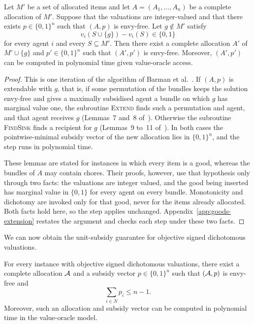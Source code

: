 \begin{lemma}
\label{lem:goods-extension}
Let $M'$ be a set of allocated items and let $A=(A_1,\ldots,A_n)$ be a complete
allocation of $M'$. Suppose that the valuations are integer-valued and that
there exists $p\in\{0,1\}^n$ such that $(A,p)$ is envy-free. Let $g\notin M'$
satisfy
\[
  v_i(S\cup\{g\})-v_i(S)\in\{0,1\}
\]
for every agent $i$ and every $S\subseteq M'$. Then there exist a complete
allocation $A'$ of $M'\cup\{g\}$ and $p'\in\{0,1\}^n$ such that $(A',p')$ is
envy-free. Moreover, $(A',p')$ can be computed in polynomial time given
value-oracle access.
\end{lemma}

\begin{proof}
This is one iteration of the algorithm of Barman et al.~\cite{BKNS22}. If
$(A,p)$ is extendable with $g$, that is, if some permutation of the bundles keeps
the solution envy-free and gives a maximally subsidised agent a bundle on which
$g$ has marginal value one, the subroutine \textsc{Extend} finds such a
permutation and agent, and that agent receives $g$ (Lemmas~7 and~8
of~\cite{BKNS22}). Otherwise the subroutine \textsc{FindSink} finds a recipient
for $g$ (Lemmas~9 to~11 of~\cite{BKNS22}). In both cases the pointwise-minimal
subsidy vector of the new allocation lies in $\{0,1\}^n$, and the step runs in
polynomial time.

These lemmas are stated for instances in which every item is a good, whereas the
bundles of $A$ may contain chores. Their proofs, however, use that hypothesis
only through two facts: the valuations are integer valued, and the good being
inserted has marginal value in $\{0,1\}$ for every agent on every bundle.
Monotonicity and dichotomy are invoked only for that good, never for the items
already allocated. Both facts hold here, so the step applies unchanged.
Appendix~\ref{app:goods-extension} restates the argument and checks each step
under these two facts.
\end{proof}

We can now obtain the unit-subsidy guarantee for objective signed dichotomous
valuations.

\begin{theorem}
\label{thm:objective-mixed}
For every instance with objective signed dichotomous valuations, there exist a
complete allocation $\mathcal{A}$ and a subsidy vector $p\in\{0,1\}^n$ such that
$(\mathcal{A},p)$ is envy-free and
\[
  \sum_{i\in N} p_i\leq n-1.
\]
Moreover, such an allocation and subsidy vector can be computed in polynomial
time in the value-oracle model.
\end{theorem}

